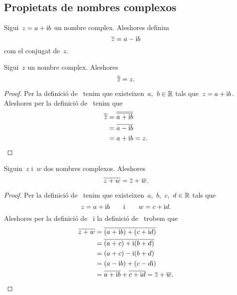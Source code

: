 \documentclass[../Apunts.tex]{subfiles}
\begin{document}
	\subsection{Propietats de nombres complexos}
	\begin{definition}
		\label{def:conjugat d'un nombre complex}
		Sigui~\(z=a+\mathrm{i} b\) un nombre complex. Aleshores definim
		\[\overline{z}=a-\mathrm{i} b\]
		com el conjugat de~\(z\).
	\end{definition}
	\begin{proposition}
		\label{prop:el conjugat del conjugat d'un nombre complex és ell mateix}
		Sigui~\(z\) un nombre complex. Aleshores
		\[\overline{\overline{z}}=z.\]
	\end{proposition}
	\begin{proof}
		Per la definició de~ tenim que existeixen~\(a\),~\(b\in\mathbb{R}\) tals que~\(z=a+\mathrm{i} b\). Aleshores per la definició de~ tenim que
		\begin{align*}
			\overline{\overline{z}}&=\overline{\overline{a+\mathrm{i} b}} \\
			&=\overline{a-\mathrm{i} b} \\
			&=a+\mathrm{i} b=z.\qedhere
		\end{align*}
	\end{proof}
	\begin{proposition}
		\label{prop:el conjugat de la suma és la suma de conjugats}
		Siguin~\(z\) i~\(w\) dos nombres complexos. Aleshores
		\[\overline{z+w}=\overline{z}+\overline{w}.\]
	\end{proposition}
	\begin{proof}
		Per la definició de~ tenim que existeixen~\(a\),~\(b\),~\(c\),~\(d\in\mathbb{R}\) tals que
		\[z=a+\mathrm{i} b\qquad\text{i}\qquad w=c+\mathrm{i} d.\]
		Aleshores per la definició de~ i la definició de~ trobem que
		\begin{align*}
			\overline{z+w}&=\overline{(a+\mathrm{i} b)+(c+\mathrm{i} d)} \\
			&=\overline{(a+c)+\mathrm{i}(b+d)} \\
			&=(a+c)-\mathrm{i}(b+d) \\
			&=(a-\mathrm{i} b)+(c-d\mathrm{i}) \\
			&=\overline{a+\mathrm{i} b}+\overline{c+\mathrm{i} d}=\overline{z}+\overline{w}.\qedhere
		\end{align*}
	\end{proof}
\end{document}
